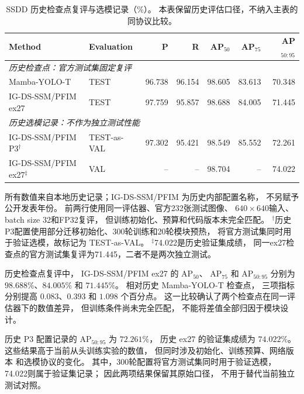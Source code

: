 \begin{table}[!t]
\centering
\small
\setlength{\tabcolsep}{4pt}
\renewcommand{\arraystretch}{1.10}
\caption{SSDD 历史检查点复评与选模记录（\%）。
本表保留历史评估口径，不纳入主表的同协议比较。}
\label{tab:ssdd_historical_detection}
\begin{tabular*}{\textwidth}{@{\extracolsep{\fill}}llrrrrr}
\toprule
Method & Evaluation & P & R
& AP$_{50}$ & AP$_{75}$ & AP$_{50:95}$ \\
\midrule
\multicolumn{7}{l}{\textit{历史检查点：官方测试集固定复评}} \\
Mamba-YOLO-T~\cite{mambayolo2024}
& TEST & 96.738 & 96.154 & 98.605 & 83.613 & 70.348 \\
IG-DS-SSM/PFIM ex27
& TEST & 97.759 & 95.857 & 98.688 & 84.005 & 71.445 \\
\midrule
\multicolumn{7}{l}{\textit{历史选模记录：不作为独立测试性能}} \\
IG-DS-SSM/PFIM P3$^{\dagger}$
& TEST-as-VAL & 97.302 & 95.421 & 98.549 & 85.552 & 72.261 \\
IG-DS-SSM/PFIM ex27$^{\ddagger}$
& VAL & -- & -- & 98.704 & -- & 74.022 \\
\bottomrule
\end{tabular*}
\smallskip
\begin{minipage}{\linewidth}
\footnotesize
所有数值来自本地历史记录；IG-DS-SSM/PFIM 为历史内部配置名称，
不另赋予公开发表年份。
前两行使用同一评估器、官方232张测试图像、
$640\times640$输入、batch size 32和FP32复评，
但训练初始化、预算和代码版本未完全匹配。
$^{\dagger}$历史P3配置使用部分迁移初始化、300轮训练和20轮模块预热，
将官方测试集同时用于验证选模，故标记为 TEST-as-VAL。
$^{\ddagger}$74.022是历史验证集成绩，
同一ex27检查点的官方测试集复评为71.445，二者不是两次独立测试。
\end{minipage}
\end{table}

历史检查点复评中，
IG-DS-SSM/PFIM ex27 的 AP$_{50}$、
AP$_{75}$ 和 AP$_{50:95}$
分别为 $98.688\%$、$84.005\%$ 和 $71.445\%$。
相对历史 Mamba-YOLO-T 检查点，
三项指标分别提高 $0.083$、$0.393$
和 $1.098$ 个百分点。
这一比较确认了两个检查点在同一评估器下的数值差异，
但训练条件尚未完全匹配，
不能将差值全部归因于模块设计。

历史 P3 配置记录的 AP$_{50:95}$ 为 $72.261\%$，
历史 ex27 的验证集成绩为 $74.022\%$。
这些结果高于当前从头训练实验的数值，
但同时涉及初始化、训练预算、网络版本
和选模协议的变化。
其中，300轮配置将官方测试集同时用于验证选模，
74.022则属于验证集记录；
因此两项结果保留其原始口径，
不用于替代当前独立测试对照。

